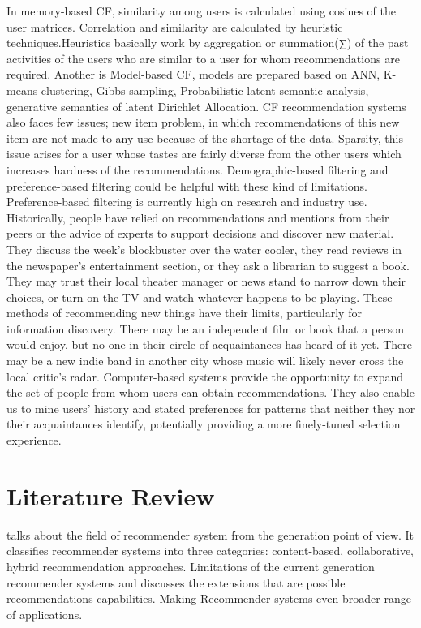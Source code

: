 \documentclass[12pt,a4paper]{article}
\begin{document}
In memory-based CF, similarity among users is calculated using cosines of the user matrices. Correlation and similarity are calculated by heuristic techniques.Heuristics basically work by aggregation or summation(∑) of the past activities of the users who are similar to a user for whom recommendations are required. Another is Model-based CF, models are prepared based on ANN, K-means clustering, Gibbs sampling, Probabilistic latent semantic analysis, generative semantics of latent Dirichlet Allocation. CF recommendation systems also faces few issues; new item problem, in which recommendations of this new item are not made to any use because of the shortage of the data. Sparsity, this issue arises for a user whose tastes are fairly diverse from the other users which increases hardness of the recommendations. Demographic-based filtering and preference-based filtering could be helpful with these kind of limitations. Preference-based filtering is currently high on research and industry use.\\

Historically, people have relied on recommendations and mentions
from their peers or the advice of experts to support decisions and discover new material. They discuss the week’s blockbuster over the water cooler, they read reviews in the newspaper’s entertainment section, or they ask a librarian to suggest a book. They may trust their local theater manager or news stand to narrow down their choices, or turn on the TV and watch whatever happens to be playing.
These methods of recommending new things have their limits, particularly for information discovery. There may be an independent film or book that a person would enjoy, but no one in their circle of acquaintances has heard of it yet. There may be a new indie band in another city whose music will likely never cross the local critic’s radar. Computer-based systems provide the opportunity to expand the
set of people from whom users can obtain recommendations. They also
enable us to mine users’ history and stated preferences for patterns that
neither they nor their acquaintances identify, potentially providing a
more finely-tuned selection experience.\\



	\newpage
	\section{Literature Review}
	
	\cite{adomavicius2005toward} talks about the field of recommender system from the generation point of view. It classifies recommender systems into three categories: content-based, collaborative, hybrid recommendation approaches.
	Limitations of the current generation recommender systems and discusses the extensions that are possible recommendations capabilities. Making Recommender systems even broader range of applications. \\
	
\end{document}
